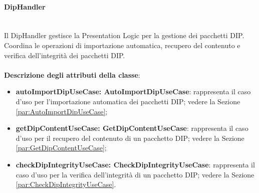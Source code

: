 \documentclass[a4paper,12pt]{article}
\begin{document}
{{                \paragraph{DipHandler}\label{par:DipHandler}\mbox{}\\
                Il DipHandler gestisce la Presentation Logic per la gestione dei pacchetti DIP. Coordina le operazioni di importazione automatica, recupero del contenuto e verifica dell'integrità dei pacchetti DIP.\\
                \\
                \textbf{Descrizione degli attributi della classe}:
                \begin{itemize}
                    \item \textbf{autoImportDipUseCase: AutoImportDipUseCase}: rappresenta il caso d'uso per l'importazione automatica dei pacchetti DIP; vedere la Sezione \ref{par:AutoImportDipUseCase};
                    \item \textbf{getDipContentUseCase: GetDipContentUseCase}: rappresenta il caso d'uso per il recupero del contenuto di un pacchetto DIP; vedere la Sezione \ref{par:GetDipContentUseCase};
                    \item \textbf{checkDipIntegrityUseCase: CheckDipIntegrityUseCase}: rappresenta il caso d'uso per la verifica dell'integrità di un pacchetto DIP; vedere la Sezione \ref{par:CheckDipIntegrityUseCase}.
                \end{itemize}
                
}}
\end{document}
